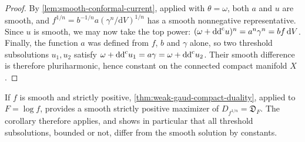 \begin{proof}
By \cref{lem:smooth-conformal-current}, applied with $\theta=\omega$, both $a$ and $u$ are smooth, and $f^{1/n}=b^{-1/n}a(\gamma^n/\mathrm{d}V)^{1/n}$ has a smooth nonnegative representative. Since $u$ is smooth, we may now take the top power: $(\omega+\mathrm{dd}^{\mathrm{c}} u)^n=a^n\gamma^n=bf\,\mathrm{d}V$. Finally, the function $a$ was defined from $f$, $b$ and $\gamma$ alone, so two threshold subsolutions $u_1,u_2$ satisfy $\omega+\mathrm{dd}^{\mathrm{c}} u_1=a\gamma=\omega+\mathrm{dd}^{\mathrm{c}} u_2$. Their smooth difference is therefore pluriharmonic, hence constant on the connected compact manifold $X$.
\end{proof}

If $f$ is smooth and strictly positive, \cref{thm:weak-gaud-compact-duality}, applied to $F=\log f$, provides a smooth strictly positive maximizer of $D_{f^{1/n}}=\mathfrak D_F$. The corollary therefore applies, and shows in particular that all threshold subsolutions, bounded or not, differ from the smooth solution by constants.
